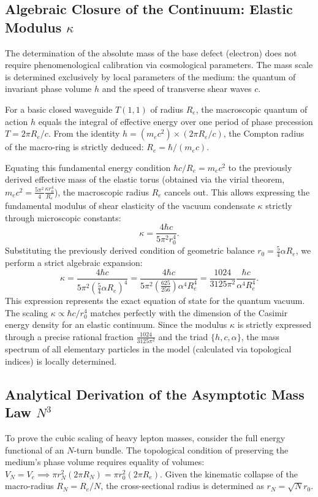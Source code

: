 \documentclass[11pt,a4paper]{article}
\begin{document}
\subsection{Algebraic Closure of the Continuum: Elastic Modulus $\kappa$}
	The determination of the absolute mass of the base defect (electron) does not require phenomenological calibration via cosmological parameters. The mass scale is determined exclusively by local parameters of the medium: the quantum of invariant phase volume $h$ and the speed of transverse shear waves $c$.
	
	For a basic closed waveguide $T(1,1)$ of radius $R_e$, the macroscopic quantum of action $h$ equals the integral of effective energy over one period of phase precession $T = 2\pi R_e/c$. From the identity $h = (m_e c^2) \times (2\pi R_e/c)$, the Compton radius of the macro-ring is strictly deduced: $R_e = \hbar / (m_e c)$. 
	
	Equating this fundamental energy condition $\hbar c / R_e = m_e c^2$ to the previously derived effective mass of the elastic torus (obtained via the virial theorem, $m_e c^2 = \frac{5\pi^2}{4} \frac{\kappa r_0^4}{R_e}$), the macroscopic radius $R_e$ cancels out. This allows expressing the fundamental modulus of shear elasticity of the vacuum condensate $\kappa$ strictly through microscopic constants:
	\begin{equation}
		\kappa = \frac{4 \hbar c}{5\pi^2 r_0^4}.
	\end{equation}
	Substituting the previously derived condition of geometric balance $r_0 = \frac{5}{4}\alpha R_e$, we perform a strict algebraic expansion:
	\begin{equation}
		\kappa = \frac{4 \hbar c}{5\pi^2 \left( \frac{5}{4}\alpha R_e \right)^4} = \frac{4 \hbar c}{5\pi^2 \left( \frac{625}{256} \right) \alpha^4 R_e^4} = \frac{1024}{3125 \pi^2} \frac{\hbar c}{\alpha^4 R_e^4}.
	\end{equation}
	This expression represents the exact equation of state for the quantum vacuum. The scaling $\kappa \propto \hbar c / r_0^4$ matches perfectly with the dimension of the Casimir energy density for an elastic continuum. 
	Since the modulus $\kappa$ is strictly expressed through a precise rational fraction $\frac{1024}{3125\pi^2}$ and the triad $\{h, c, \alpha\}$, the mass spectrum of all elementary particles in the model (calculated via topological indices) is locally determined.
	
\subsection{Analytical Derivation of the Asymptotic Mass Law $N^3$}
	To prove the cubic scaling of heavy lepton masses, consider the full energy functional of an $N$-turn bundle. The topological condition of preserving the medium's phase volume requires equality of volumes: $V_N = V_e \implies \pi r_N^2 (2\pi R_N) = \pi r_0^2 (2\pi R_e)$. Given the kinematic collapse of the macro-radius $R_N = R_e / N$, the cross-sectional radius is determined as $r_N = \sqrt{N} r_0$.
	
\end{document}
